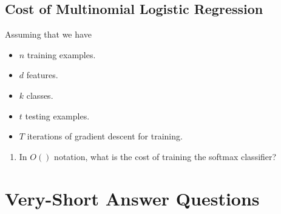 \documentclass{article}
\def\blu#1{{\color{blu}#1}}
\def\items#1{\begin{itemize}#1\end{itemize}}
\def\enum#1{\begin{enumerate}#1\end{enumerate}}
\begin{document}
\subsection{Cost of Multinomial Logistic Regression}

Assuming that we have
\items{
\item $n$ training examples.
\item $d$ features.
\item $k$ classes.
\item $t$ testing examples.
\item $T$ iterations of gradient descent for training.
}
\blu{\enum{
\item In $O()$ notation, what is the cost of training the softmax classifier?
}}



\section{Very-Short Answer Questions}
\end{document}
